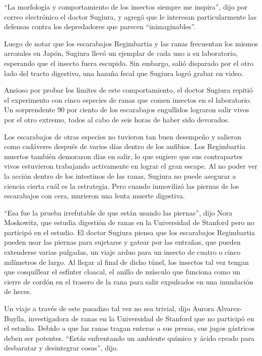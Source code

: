 ``La morfología y comportamiento de los insectos siempre me inspira'',
dijo por correo electrónico el doctor Sugiura, y agregó que le interesan
particularmente las defensas contra los depredadores que parecen
``inimaginables''.

Luego de notar que los escarabajos Regimbartia y las ranas frecuentan
los mismos arrozales en Japón, Sugiura llevó un ejemplar de cada uno a
su laboratorio, esperando que el insecto fuera escupido. Sin embargo,
salió disparado por el otro lado del tracto digestivo, una hazaña fecal
que Sugiura logró grabar en video.

Ansioso por probar los límites de este comportamiento, el doctor Sugiura
repitió el experimento con cinco especies de ranas que comen insectos en
el laboratorio. Un sorprendente 90 por ciento de los escarabajos
engullidos lograron salir vivos por el otro extremo, todos al cabo de
seis horas de haber sido devorados.

Los escarabajos de otras especies no tuvieron tan buen desempeño y
salieron como cadáveres después de varios días dentro de los anfibios.
Los Regimbartia muertos también demoraron días en salir, lo que sugiere
que sus contrapartes vivos estuvieron trabajando activamente en lograr
el gran escape. Al no poder ver la acción dentro de los intestinos de
las ranas, Sugiura no puede asegurar a ciencia cierta cuál es la
estrategia. Pero cuando inmovilizó las piernas de los escarabajos con
cera, murieron una lenta muerte digestiva.

``Esa fue la prueba irrefutable de que están usando las piernas'', dijo
Nora Moskowitz, que estudia digestión de ranas en la Universidad de
Stanford pero no participó en el estudio. El doctor Sugiura piensa que
los escarabajos Regimbartia pueden usar las piernas para sujetarse y
gatear por las entrañas, que pueden extenderse varias pulgadas, un viaje
arduo para un insecto de cuatro o cinco milímetros de largo. Al llegar
al final de dicho túnel, los insectos tal vez tengan que cosquillear el
esfínter cloacal, el anillo de músculo que funciona como un cierre de
cordón en el trasero de la rana para salir expulsados en una inundación
de heces.

Un viaje a través de este pasadizo tal vez no sea trivial, dijo Aurora
Alvarez-Buylla, investigadora de ranas en la Universidad de Stanford que
no participó en el estudio. Debido a que las ranas tragan enteras a sus
presas, sus jugos gástricos deben ser potentes. ``Estás enfrentando un
ambiente químico y ácido creado para desbaratar y desintegrar cosas'',
dijo.

